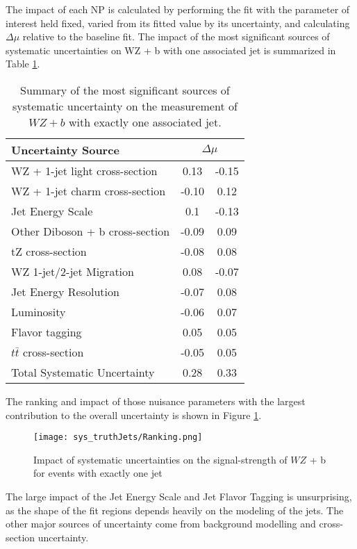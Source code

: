 The impact of each NP is calculated by performing the fit with the parameter of interest held fixed, varied from its fitted value by its uncertainty, and calculating $\Delta\mu$ relative to the baseline fit.  The impact of the most significant sources of systematic uncertainties on WZ + b with one associated jet is summarized in Table \ref{tab:systematics_1j}. 

\begin{table}[H]
    \centering
    \begin{tabular}{l|cc}
        \hline\hline
        Uncertainty Source & \multicolumn{2}{c}{$\Delta \mu$ }  \\
        \hline
        WZ + 1-jet light cross-section & 0.13 & -0.15 \\
        WZ + 1-jet charm cross-section & -0.10 & 0.12 \\
        Jet Energy Scale & 0.1 & -0.13 \\
        Other Diboson + b cross-section & -0.09 & 0.09 \\
        tZ cross-section & -0.08 & 0.08 \\
        WZ 1-jet/2-jet Migration & 0.08 & -0.07 \\
        Jet Energy Resolution & -0.07 & 0.08 \\
        Luminosity & -0.06 & 0.07 \\
        Flavor tagging & 0.05 & 0.05 \\
        $t\bar{t}$ cross-section & -0.05 & 0.05 \\
        \hline
        Total Systematic Uncertainty & 0.28 & 0.33 \\
        \hline\hline
    \end{tabular}
    \caption{Summary of the most significant sources of systematic uncertainty on the measurement of $WZ+b$ with exactly one associated jet.}
    \label{tab:systematics_1j}
\end{table}

The ranking and impact of those nuisance parameters with the largest contribution to the overall uncertainty is shown in Figure \ref{fig:ranking_1j}.

\begin{figure}[H]
    \centering
    \texttt{[image: sys\_truthJets/Ranking.png]}
    \caption{Impact of systematic uncertainties on the signal-strength of $WZ$ + b for events with exactly one jet}
    \label{fig:ranking_1j}
\end{figure}

The large impact of the Jet Energy Scale and Jet Flavor Tagging is unsurprising, as the shape of the fit regions depends heavily on the modeling of the jets. The other major sources of uncertainty come from background modelling and cross-section uncertainty. %

